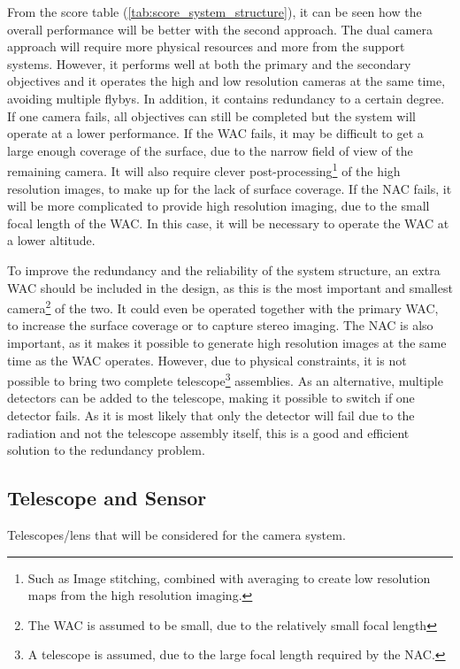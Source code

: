 From the score table (\ref{tab:score_system_structure}), it can be seen how the overall performance will be better with the second approach. The dual camera approach will require more physical resources and more from the support systems. However, it performs well at both the primary and the secondary objectives and it operates the high and low resolution cameras at the same time, avoiding multiple flybys. In addition, it contains redundancy to a certain degree. If one camera fails, all objectives can still be completed but the system will operate at a lower performance. If the WAC fails, it may be difficult to get a large enough coverage of the surface, due to the narrow field of view of the remaining camera. It will also require clever post-processing\footnote{Such as Image stitching, combined with averaging to create low resolution maps from the high resolution imaging.} of the high resolution images, to make up for the lack of surface coverage. If the NAC fails, it will be more complicated to provide high resolution imaging, due to the small focal length of the WAC. In this case, it will be necessary to operate the WAC at a lower altitude.

To improve the redundancy and the reliability of the system structure, an extra WAC should be included in the design, as this is the most important and smallest camera\footnote{The WAC is assumed to be small, due to the relatively small focal length} of the two. It could even be operated together with the primary WAC, to increase the surface coverage or to capture stereo imaging. The NAC is also important, as it makes it possible to generate high resolution images at the same time as the WAC operates. However, due to physical constraints, it is not possible to bring two complete telescope\footnote{A telescope is assumed, due to the large focal length required by the NAC.} assemblies. As an alternative, multiple detectors can be added to the telescope, making it possible to switch if one detector fails. As it is most likely that only the detector will fail due to the radiation and not the telescope assembly itself, this is a good and efficient solution to the redundancy problem. 
\subsection{Telescope and Sensor}
Telescopes/lens that will be considered for the camera system. 
